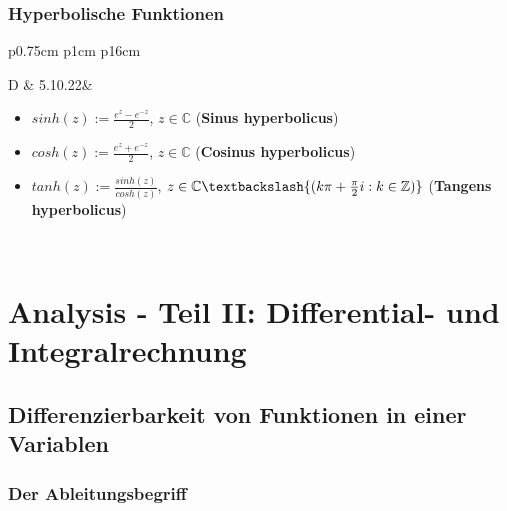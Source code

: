 \subsubsection{Hyperbolische Funktionen}
      
    \begin{longtable}{p{0.75cm} p{1cm} p{16cm}}
        \toprule

        D   & 5.10.22&  \begin{minipage}{\linewidth}
                            \begin{itemize}
                                \item[] $sinh(z) := \frac{e^z-e^{-z}}{2}$, $z \in \mathbb{C}$ (\textbf{Sinus hyperbolicus})
                                \item[] $cosh(z) := \frac{e^z+e^{-z}}{2}$, $z \in \mathbb{C}$ (\textbf{Cosinus hyperbolicus})
                                \item[] $tanh(z) := \frac{sinh(z)}{cosh(z)}$, $z \in \mathbb{C} \textbackslash \{(k\pi + \frac{\pi}{2}i: k \in \mathbb{Z})\}$ (\textbf{Tangens hyperbolicus})
                            \end{itemize}
                        \end{minipage} \\

        \bottomrule

    \end{longtable}

\pagebreak

\section{Analysis - Teil II: Differential- und Integralrechnung}
\subsection{Differenzierbarkeit von Funktionen in einer Variablen}
\subsubsection{Der Ableitungsbegriff}

